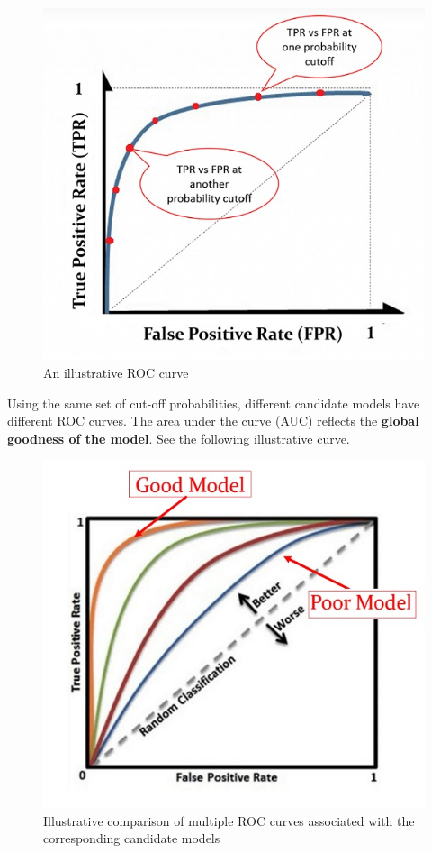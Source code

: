 \documentclass[
]{book}
\begin{document}
\begin{figure}

{\centering \includegraphics[width=0.8\linewidth]{img08/w08-roc} 

}

\caption{An illustrative ROC curve}\label{fig:unnamed-chunk-142}
\end{figure}

Using the same set of cut-off probabilities, different candidate models have different ROC curves. The area under the curve (AUC) reflects the \textbf{global goodness of the model}. See the following illustrative curve.

\begin{figure}

{\centering \includegraphics[width=0.8\linewidth]{img08/w08-roc-2} 

}

\caption{Illustrative comparison of multiple ROC curves associated with the corresponding candidate models}\label{fig:unnamed-chunk-143}
\end{figure}
\end{document}
